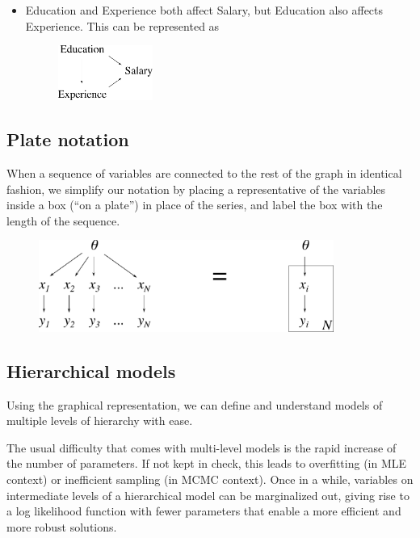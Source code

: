 \begin{itemize}
	\item Education and Experience both affect Salary, but Education also affects Experience. This can be represented as
	\begin{figure}[h!]
	\centering
		\includegraphics[height=18mm]{./figs/04-education-salary.pdf} 
	\end{figure}
\end{itemize}

\subsection{Plate notation}
When a sequence of variables are connected to the rest of the graph in identical fashion, we simplify our notation by placing a representative of the variables inside a box (``on a plate'') in place of the series, and label the box with the length of the sequence.
\begin{figure}[h!]
\centering
	\includegraphics[height=30mm]{./figs/04-plate-notation.pdf}
\end{figure}

\newpage
\subsection{Hierarchical models}
\label{sec:Hiararchical models}
Using the graphical representation, we can define and understand models of multiple levels of hierarchy with ease. 

The usual difficulty that comes with multi-level models is the rapid increase of the number of parameters. If not kept in check, this leads to overfitting (in MLE context) or inefficient sampling (in MCMC context). Once in a while, variables on intermediate levels of a hierarchical model can be marginalized out, giving rise to a log likelihood function with fewer parameters that enable a more efficient and more robust solutions.
\\

